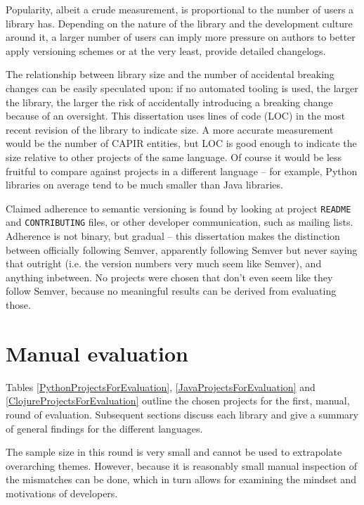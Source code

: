 \documentclass{l4proj}
\newcommand\genericstyle{\lstset{basicstyle=\ttm}}
\newcommand\codeinline[1]{{\genericstyle\lstinline!#1!}}
\begin{document}
Popularity, albeit a crude measurement, is proportional to the number
of users a library has. Depending on the nature of the library and the
development culture around it, a larger number of users can imply more
pressure on authors to better apply versioning schemes or at the very
least, provide detailed changelogs.

The relationship between library size and the number of accidental
breaking changes can be easily speculated upon: if no automated
tooling is used, the larger the library, the larger the risk of
accidentally introducing a breaking change because of an oversight.
This dissertation uses lines of code (LOC) in the most recent revision
of the library to indicate size. A more accurate measurement would be
the number of CAPIR entities, but LOC is good enough to indicate the
size relative to other projects of the same language. Of course it
would be less fruitful to compare against projects in a different
language -- for example, Python libraries on average tend to be much
smaller than Java libraries.

Claimed adherence to semantic versioning is found by looking at
project \codeinline{README} and \codeinline{CONTRIBUTING} files, or
other developer communication, such as mailing lists. Adherence is not
binary, but gradual -- this dissertation makes the distinction between
officially following Semver, apparently following Semver but never
saying that outright (i.e. the version numbers very much seem like
Semver), and anything inbetween. No projects were chosen that don't
even seem like they follow Semver, because no meaningful results can
be derived from evaluating those.

\section{Manual evaluation}

Tables \ref{PythonProjectsForEvaluation},
\ref{JavaProjectsForEvaluation} and \ref{ClojureProjectsForEvaluation}
outline the chosen projects for the first, manual, round of
evaluation. Subsequent sections discuss each library and give a
summary of general findings for the different languages.

The sample size in this round is very small and cannot be used to
extrapolate overarching themes. However, because it is reasonably
small manual inspection of the mismatches can be done, which in turn
allows for examining the mindset and motivations of developers.
\end{document}
